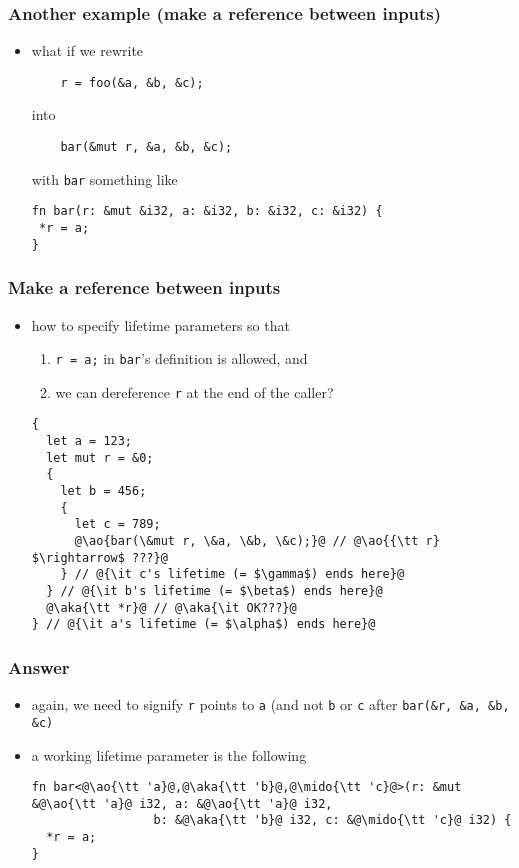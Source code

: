\documentclass[12pt,dvipdfmx]{beamer}
\newcommand{\mido}[1]{{\color{green}#1}}
\newcommand{\ao}[1]{{\color{blue}#1}}
\newcommand{\aka}[1]{{\color{red}#1}}
\begin{document}
\begin{frame}[fragile]
  \frametitle{Another example (make a reference between inputs)}
\begin{itemize}
\item what if we rewrite
\begin{lstlisting}
    r = foo(&a, &b, &c);
\end{lstlisting}
into 
\begin{lstlisting}
    bar(&mut r, &a, &b, &c);
\end{lstlisting}
with {\tt bar} something like
\begin{lstlisting}
fn bar(r: &mut &i32, a: &i32, b: &i32, c: &i32) {
 *r = a;
}
\end{lstlisting}
\end{itemize}
\end{frame}

\begin{frame}[fragile]
  \frametitle{Make a reference between inputs}
\begin{itemize}
\item how to specify lifetime parameters so that
  \begin{enumerate}
  \item {\tt *r = a;} in {\tt bar}'s definition is allowed, and
  \item we can dereference {\tt *r} at the end of the caller?
  \end{enumerate}
\begin{lstlisting}[basicstyle=\ttfamily\tiny]
{
  let a = 123;
  let mut r = &0;
  {
    let b = 456;
    {
      let c = 789;
      @\ao{bar(\&mut r, \&a, \&b, \&c);}@ // @\ao{{\tt r} $\rightarrow$ ???}@
    } // @{\it c's lifetime (= $\gamma$) ends here}@
  } // @{\it b's lifetime (= $\beta$) ends here}@
  @\aka{\tt *r}@ // @\aka{\it OK???}@
} // @{\it a's lifetime (= $\alpha$) ends here}@
\end{lstlisting}
\end{itemize}
\end{frame}


\begin{frame}[fragile]
  \frametitle{Answer}
\begin{itemize}
\item again, we need to signify {\tt r} points to {\tt a} (and not {\tt b} or {\tt c} after {\tt bar(\&r, \&a, \&b, \&c)}
\item a working lifetime parameter is the following
\begin{lstlisting}
fn bar<@\ao{\tt 'a}@,@\aka{\tt 'b}@,@\mido{\tt 'c}@>(r: &mut &@\ao{\tt 'a}@ i32, a: &@\ao{\tt 'a}@ i32,
                 b: &@\aka{\tt 'b}@ i32, c: &@\mido{\tt 'c}@ i32) {
  *r = a;
}    
\end{lstlisting}
\end{itemize}
\end{frame}
\end{document}
